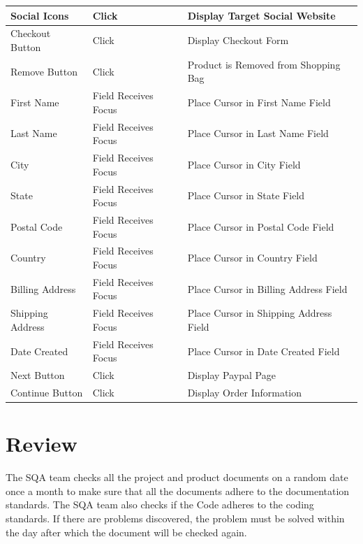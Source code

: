 \documentclass{report}
\begin{document}
\begin{center}
	\begin{tabular}{ m{1.5in} | m{1.5in} | m{1.5in} }
	Social Icons & Click & Display Target Social Website \\
	\hline
	Checkout Button 		& Click 					& Display Checkout Form \\
	\hline
	Remove Button 		& Click 					& Product is Removed from Shopping Bag \\
	\hline
	First Name 			& Field Receives Focus 	& Place Cursor in First Name Field \\
	\hline
	Last Name 			& Field Receives Focus 	& Place Cursor in Last Name Field \\
	\hline
	City 				& Field Receives Focus 	& Place Cursor in City Field \\
	\hline
	State 				& Field Receives Focus 	& Place Cursor in State Field \\
	\hline
	Postal Code 			& Field Receives Focus 	& Place Cursor in Postal Code Field \\
	\hline
	Country 				& Field Receives Focus 	& Place Cursor in Country Field \\
	\hline
	Billing Address 		& Field Receives Focus 	& Place Cursor in Billing Address Field \\
	\hline
	Shipping Address 	& Field Receives Focus 	& Place Cursor in Shipping Address Field \\
	\hline
	Date Created 		& Field Receives Focus 	& Place Cursor in Date Created Field \\
	\hline
	Next Button 			& Click 					& Display Paypal Page \\
	\hline
	Continue Button 		& Click 					& Display Order Information \\
	
	\end{tabular}
	
\end{center}



\section{Review}
The SQA team checks all the project and product documents on a random date once a month to make sure that all the documents adhere to the documentation standards. The SQA team also checks if the Code adheres to the coding standards. If there are problems discovered, the problem must be solved within the day after which the document will be checked again.
\end{document}
